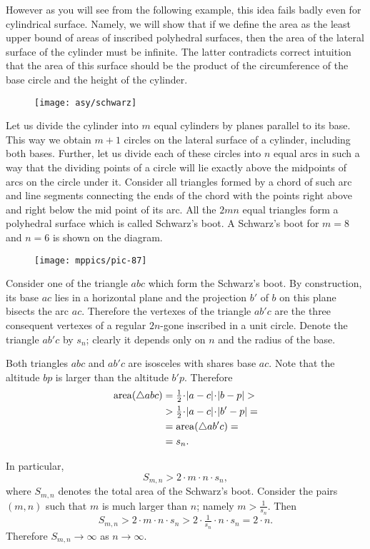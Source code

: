 However as you will see from the following example, this idea fails badly even for cylindrical surface.
Namely, we will show that if we define the area as the least upper bound of areas of inscribed polyhedral surfaces, 
then the area of the lateral surface of the cylinder must be infinite.
The latter contradicts correct intuition that the area of this surface should be the product of the circumference of the base circle and the height of the cylinder.


\begin{wrapfigure}{r}{42 mm}
\centering
\texttt{[image: asy/schwarz]}
\end{wrapfigure}

Let us divide the cylinder into $m$ equal cylinders by planes parallel to its base.
This way we obtain $m+1$ circles on the lateral surface of a cylinder, including both bases.
Further, let us divide each of these circles into $n$ equal arcs in such a way that the dividing points 
of a circle will lie exactly above the midpoints of arcs on the circle under it.
Consider all triangles formed by a chord of such arc and line segments connecting the ends of the chord with the points right above and right below the mid point of its arc.
All the $2mn$ equal triangles form a polyhedral surface which is called Schwarz's boot.
A Schwarz's boot for $m=8$ and $n=6$ is shown on the diagram.

{

\begin{wrapfigure}{o}{40 mm}
\centering
\texttt{[image: mppics/pic-87]}
\end{wrapfigure}

Consider one of the triangle $abc$ which form the Schwarz's boot.
By construction, its base $ac$ lies in a horizontal plane and the projection $b'$ of $b$ on this plane bisects the arc $ac$.
Therefore the vertexes of the triangle $ab'c$ are the three consequent vertexes of a regular $2n$-gone inscribed in a unit circle.
Denote the triangle $ab'c$ by $s_n$; clearly it depends only on $n$ and the radius of the base.


Both triangles $abc$ and $ab'c$ are isosceles with shares base $ac$.
Note that the altitude $bp$ is larger than the altitude $b'p$.
Therefore
\begin{align*}
\area (\triangle abc)&=\tfrac12\cdot |a-c|\cdot |b-p|>
\\
&>\tfrac12\cdot |a-c|\cdot |b'-p|=
\\
&=\area (\triangle ab'c)=
\\
&=s_n.
\end{align*}

}

In particular,
\[S_{m,n}>2\cdot m\cdot n\cdot s_n,\]
where $S_{m,n}$ denotes the total area of the Schwarz's boot.
Consider the pairs $(m,n)$ such that $m$ is much larger than $n$; namely $m>\tfrac1{s_n}$.
Then
\[S_{m,n}> 2\cdot  m\cdot  n\cdot  s_n>2\cdot  \tfrac1{s_n}\cdot  n\cdot  s_n=2\cdot n.\]
Therefore $S_{m,n}\to \infty$ as $n\to \infty$.
